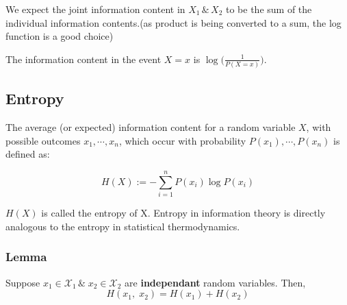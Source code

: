 \documentclass{article}
\begin{document}
We expect the joint information content in $X_1\, \&\, X_2$ to be the sum of the individual information contents.(as product is being converted to a sum, the log function is a good choice)

The information content in the event $X=x$ is $\log( {\frac{1}{P(X=x)})}$.

\subsection{Entropy}

The average (or expected) information content for a random variable $X$, with possible outcomes $x_1, \cdots, x_n$, which occur with probability $P(x_1),\cdots, P(x_n)$ is defined as:

$$ H(X) :=- \sum_{i=1}^{n} P(x_i) \log P(x_i)$$

$H(X)$ is called the entropy of X. Entropy in information theory is directly analogous to the entropy in statistical thermodynamics.

\subsubsection{Lemma}
Suppose $x_1 \in \mathcal{X}_1\, \&\; x_2 \in \mathcal{X}_2$ are \textbf{independant} random variables. Then,
$$ H(x_1,\;x_2)=H(x_1)+H(x_2)$$
\end{document}
